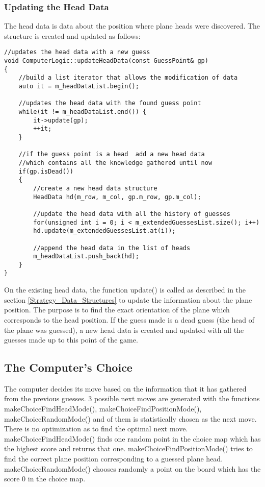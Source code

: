 \subsubsection {Updating the Head Data}

The head data is data about the position where plane heads were discovered. The structure is created and updated as follows:

\begin{lstlisting}
//updates the head data with a new guess
void ComputerLogic::updateHeadData(const GuessPoint& gp)
{
	//build a list iterator that allows the modification of data
	auto it = m_headDataList.begin();
	
	//updates the head data with the found guess point
	while(it != m_headDataList.end()) {
		it->update(gp);
		++it;
	}
	
	//if the guess point is a head  add a new head data
	//which contains all the knowledge gathered until now
	if(gp.isDead())
	{
		//create a new head data structure
		HeadData hd(m_row, m_col, gp.m_row, gp.m_col);
		
		//update the head data with all the history of guesses
		for(unsigned int i = 0; i < m_extendedGuessesList.size(); i++)
		hd.update(m_extendedGuessesList.at(i));
		
		//append the head data in the list of heads
		m_headDataList.push_back(hd);
	}
}
\end{lstlisting}

On the existing head data, the function update() is called as described in the section \ref{Strategy_Data_Structures} to update the information about the plane position. The purpose is to find the exact orientation of the plane which corresponds to the head position. If the guess made is a dead guess (the head of the plane was guessed), a new head data is created and updated with all the guesses made up to this point of the game.

\subsection {The Computer's Choice}

The computer decides its move based on the information that it has gathered from the previous guesses. 3 possible next moves are generated with the functions makeChoiceFindHeadMode(),  makeChoiceFindPositionMode(),  makeChoiceRandomMode() and of them is statistically chosen as the next move. There is no optimization as to find the optimal next move. makeChoiceFindHeadMode() finds one random point in the choice map which has the highest score and returns that one. makeChoiceFindPositionMode() tries to find the correct plane position corresponding to a guessed plane head. makeChoiceRandomMode() chooses randomly a point on the board which has the score 0 in the choice map.

